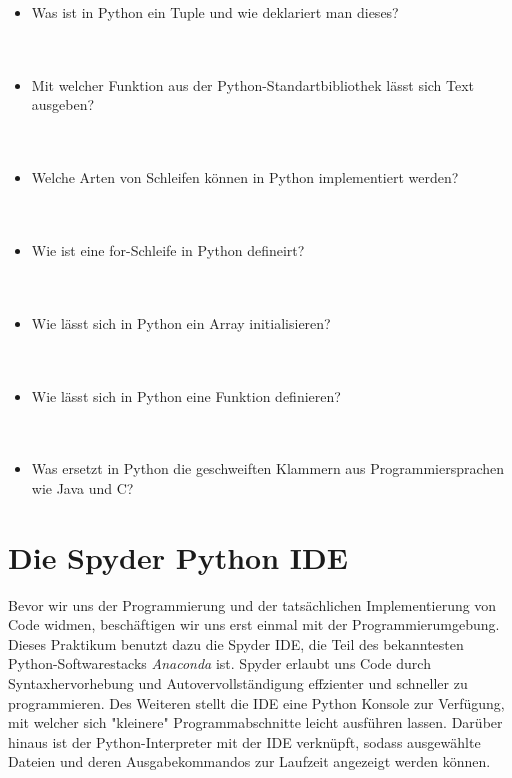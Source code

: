 \begin{itemize}
	\\
	\\
	\item{Was ist in Python ein Tuple und wie deklariert man dieses?}
	\\
	\\
	\\
	\item{Mit welcher Funktion aus der Python-Standartbibliothek lässt sich Text ausgeben?}
	\\
	\\
	\\
	\item{Welche Arten von Schleifen können in Python implementiert werden?}
	\\
	\\
	\\
	\item{Wie ist eine for-Schleife in Python defineirt?}
	\\
	\\
	\\
	\item{Wie lässt sich in Python ein Array initialisieren?}
	\\
	\\
	\\
	\item{Wie lässt sich in Python eine Funktion definieren?}
	\\
	\\
	\\
	\item{Was ersetzt in Python die geschweiften Klammern aus Programmiersprachen wie Java und C?}
	
\end{itemize}

\section{Die Spyder Python IDE}
Bevor wir uns der Programmierung und der tatsächlichen Implementierung von Code widmen, beschäftigen wir uns erst einmal mit der Programmierumgebung. Dieses Praktikum benutzt dazu die Spyder IDE, die Teil des bekanntesten Python-Softwarestacks \textit{Anaconda} ist. Spyder erlaubt uns Code durch Syntaxhervorhebung und Autovervollständigung effzienter und schneller zu programmieren. Des Weiteren stellt die IDE eine Python Konsole zur Verfügung, mit welcher sich "kleinere" Programmabschnitte leicht ausführen lassen. Darüber hinaus ist der Python-Interpreter mit der IDE verknüpft, sodass ausgewählte Dateien und deren Ausgabekommandos zur Laufzeit angezeigt werden können.

